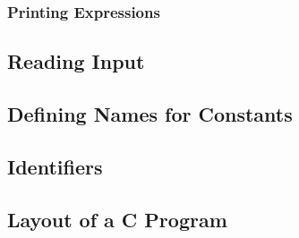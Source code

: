 \documentclass[../main.tex]{subfiles}
\begin{document}
\subsubsection*{Printing Expressions }


\subsection{Reading Input}

\subsection{Defining Names for Constants}

\subsection{Identifiers}

\subsection{Layout of a C Program}
\end{document}
